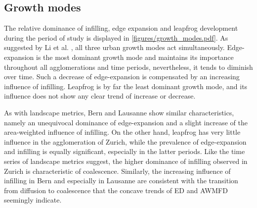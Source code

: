 \documentclass[10pt,letterpaper]{article}
\begin{document}
\subsection*{Growth modes}

The relative dominance of infilling, edge expansion and leapfrog development during the period of study is displayed in \autoref{figures/growth_modes.pdf}.
As suggested by Li et al. \cite{li2013quantifying}, all three urban growth modes act simultaneously.
Edge-expansion is the most dominant growth mode and maintains its importance throughout all agglomerations and time periods, nevertheless, it tends to diminish over time. Such a decrease of edge-expansion is compensated by an increasing influence of infilling. Leapfrog is by far the least dominant growth mode, and its influence does not show any clear trend of increase or decrease.

As with landscape metrics, Bern and Lausanne show similar characteristics, namely an unequivocal dominance of edge-expansion and a slight increase of the area-weighted influence of infilling.
On the other hand, leapfrog has very little influence in the agglomeration of Zurich, while the prevalence of edge-expansion and infilling is equally significant, especially in the latter periods.
Like the time series of landscape metrics suggest, the higher dominance of infilling observed in Zurich is characteristic of coalescence.
Similarly, the increasing influence of infilling in Bern and especially in Lausanne are consistent with the transition from diffusion to coalescence that the concave trends of ED and AWMFD seemingly indicate.
\end{document}
